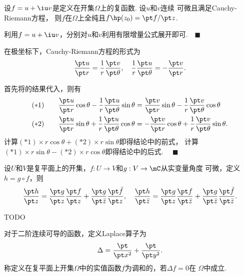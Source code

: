   \begin{thm}
    \label{thm: Cauchy-Riemann方程2}
    设$f=u+\iu v$是定义在开集$\Omega$上的复函数. 设$u$和$v$连续
    可微且满足Cauchy-Riemann方程，
    则$f$在$\Omega$上全纯且$f\hp(z_0) = \pt f/\pt z$.
  \end{thm}
  \proof
    利用$f=u+\iu v$，分别对$u$和$v$利用有限增量公式展开即可.$\quad\blacksquare$

  \begin{thm}
    \label{thm: 极坐标Cauchy-Riemann方程}
    在极坐标下，Cauchy-Riemann方程的形式为
    \[
      \frac{\pt u}{\pt r} = \frac{1}{r}\frac{\pt v}{\pt\theta},\quad
      \frac{1}{r}\frac{\pt u}{\pt\theta} = -\frac{\pt v}{\pt r}.
    \]
  \end{thm}
  \proof
    首先将的结果代入，则有
    \[\begin{split}
      (*1)\qquad\frac{\pt u}{\pt r}\cos\theta - \frac{1}{r}\frac{\pt u}{\pt\theta}\sin\theta
      &= \frac{\pt v}{\pt r}\sin\theta - \frac{1}{r}\frac{\pt v}{\pt\theta}\cos\theta\\
      (*2)\qquad\frac{\pt u}{\pt r}\sin\theta + \frac{1}{r}\frac{\pt u}{\pt\theta}\cos\theta
      &= -\frac{\pt v}{\pt r}\cos\theta + \frac{1}{r}\frac{\pt v}{\pt\theta}\sin\theta.
    \end{split}\]
    计算$(*1)\times r\cos\theta + (*2)\times r\sin\theta$即得结论中的前式，
    计算$(*1)\times r\sin\theta - (*2)\times r\cos\theta$即得结论中的后式.
    $\quad\blacksquare$

  \begin{thm}[链式法则]
    设$U$和$V$是复平面上的开集，$f:U\to V$和$g:V\to\mC$从实变量角度
    可微，定义$h=g\circ f$，则
    \[
      \frac{\pt h}{\pt z}=\frac{\pt g}{\pt z}\frac{\pt f}{\pt z}
      + \frac{\pt g}{\pt\bar{z}}\frac{\pt\bar{f}}{\pt z},\quad
      \frac{\pt h}{\pt\bar{z}} = \frac{\pt g}{\pt z}\frac{\pt f}{\pt\bar{z}}
      + \frac{\pt g}{\pt\bar{z}}\frac{\pt\bar{f}}{\pt\bar{z}}.
    \]
  \end{thm}
  \proof
    TODO

  \begin{defi}[调和]
    对于二阶连续可导的函数，定义Laplace算子为
    \[
      \Delta = \frac{\pt}{\pt x^2} + \frac{\pt}{\pt y^2}.
    \]
    称定义在复平面上开集$\Omega$中的实值函数$f$为调和的，若$\Delta f=0$在
    $\Omega$中成立.
  \end{defi}

